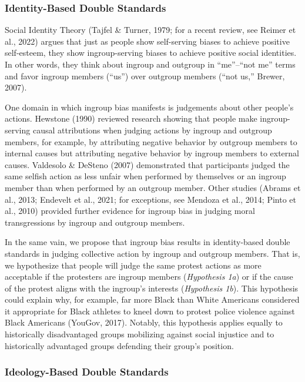 \documentclass[twocolumn, 11pt, letterpaper]{article}
\begin{document}
\hypertarget{identity-based-double-standards}{%
\subsubsection{Identity-Based Double
Standards}\label{identity-based-double-standards}}

Social Identity Theory (Tajfel \& Turner, 1979; for a recent review, see
Reimer et al., 2022) argues that just as people show self-serving biases
to achieve positive self-esteem, they show ingroup-serving biases to
achieve positive social identities. In other words, they think about
ingroup and outgroup in ``me''--``not me'' terms and favor ingroup
members (``us'') over outgroup members (``not us,'' Brewer, 2007).

One domain in which ingroup bias manifests is judgements about other
people's actions. Hewstone (1990) reviewed research showing that people
make ingroup-serving causal attributions when judging actions by ingroup
and outgroup members, for example, by attributing negative behavior by
outgroup members to internal causes but attributing negative behavior by
ingroup members to external causes. Valdesolo \& DeSteno (2007)
demonstrated that participants judged the same selfish action as less
unfair when performed by themselves or an ingroup member than when
performed by an outgroup member. Other studies (Abrams et al., 2013;
Endevelt et al., 2021; for exceptions, see Mendoza et al., 2014; Pinto
et al., 2010) provided further evidence for ingroup bias in judging
moral transgressions by ingroup and outgroup members.

In the same vain, we propose that ingroup bias results in identity-based
double standards in judging collective action by ingroup and outgroup
members. That is, we hypothesize that people will judge the same protest
actions as more acceptable if the protesters are ingroup members
(\emph{Hypothesis 1a}) or if the cause of the protest aligns with the
ingroup's interests (\emph{Hypothesis 1b}). This hypothesis could
explain why, for example, far more Black than White Americans considered
it appropriate for Black athletes to kneel down to protest police
violence against Black Americans (YouGov, 2017). Notably, this
hypothesis applies equally to historically disadvantaged groups
mobilizing against social injustice and to historically advantaged
groups defending their group's position.

\hypertarget{ideology-based-double-standards}{%
\subsubsection{Ideology-Based Double
Standards}\label{ideology-based-double-standards}}
\end{document}

